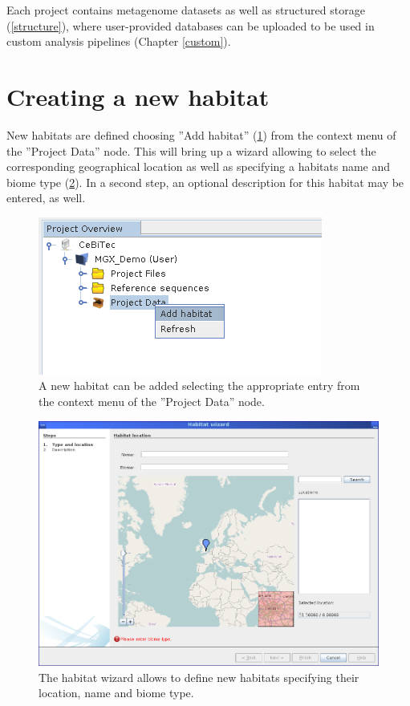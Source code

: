Each project contains metagenome datasets as well as structured storage (\ref{structure}), where user-provided
databases can be uploaded to be used in custom analysis pipelines (Chapter \ref{custom}).

\section{Creating a new habitat}

New habitats are defined choosing ''Add habitat'' (\ref{addhabitat}) from the context menu of the ''Project Data''
node. This will bring up a wizard allowing to select the corresponding geographical location as well as
specifying a habitats name and biome type (\ref{habwiz}). In a second step, an optional description for this
habitat may be entered, as well.

\begin{figure}[H]
\centering
\includegraphics[width=.6\textwidth]{img/mgx/addhabitat}
\caption[Habitat creation]{A new habitat can be added selecting the appropriate entry from the context
menu of the ''Project Data'' node.}
\label{addhabitat}
\end{figure}

\begin{figure}[H]
\centering
\includegraphics[width=.8\textwidth]{img/mgx/habwizard}
\caption[Habitat wizard]{The habitat wizard allows to define new habitats specifying their location, name and
biome type.}
\label{habwiz}
\end{figure}

